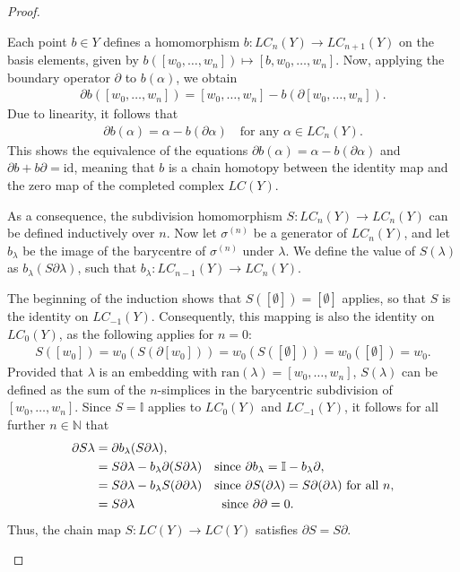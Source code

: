 \begin{proof}
\begin{enumerate}
	Each point \(b \in Y\) defines a homomorphism \(b: LC_n(Y) \rightarrow LC_{n+1}(Y)\) on the basis elements, given by $b([w_0, \ldots, w_n]) \mapsto [b, w_0, \ldots, w_n]$. Now, applying the boundary operator \(\partial\) to \(b(\alpha)\), we obtain
	\begin{align}
		\partial b([w_0, \ldots, w_n]) = [w_0, \ldots, w_n] - b(\partial [w_0, \ldots, w_n]). 
	\end{align}
	Due to linearity, it follows that 
	\begin{align}
		\partial b(\alpha) = \alpha - b(\partial \alpha) \quad \text{for any } \alpha \in LC_n(Y). 
	\end{align}
	This shows the equivalence of the equations \(\partial b(\alpha) = \alpha - b(\partial \alpha)\) and \(\partial b + b \partial = \text{id}\), meaning that \(b\) is a chain homotopy between the identity map and the zero map of the completed complex \(LC(Y)\).
		
	As a consequence, the subdivision homomorphism $S: LC_n(Y) \rightarrow LC_n(Y)$ can be defined inductively over $n$. Now let $\sigma^{(n)}$ be a generator of $LC_n(Y)$, and let $b_\lambda$ be the image of the barycentre of $\sigma^{(n)}$ under $\lambda$. We define the value of $S(\lambda)$ as $b_\lambda(S\partial\lambda)$, such that $b_\lambda: LC_{n-1}(Y) \rightarrow LC_n(Y)$. 
		
	The beginning of the induction shows that $S([\emptyset]) = [\emptyset]$ applies, so that $S$ is the identity on $LC_{-1}(Y)$. Consequently, this mapping is also the identity on $LC_0(Y)$, as the following applies for $n=0$: 
	\begin{align}
		S([w_0]) = w_0(S(\partial[w_0])) = w_0(S([\emptyset])) = w_0([\emptyset]) = w_0. 
	\end{align}
	Provided that $\lambda$ is an embedding with $\text{ran}(\lambda) = [w_0, \ldots, w_n]$, $S(\lambda)$ can be defined as the sum of the $n$-simplices in the barycentric subdivision of $[w_0, \ldots, w_n]$. Since $S = \mathbb{I}$ applies to $LC_0(Y)$ and $LC_{-1}(Y)$, it follows for all further $n \in \mathbb{N}$ that
	\begin{align}
		\partial S\lambda & = \partial b_\lambda(S\partial\lambda),                                                                                                                    \\
		                  & = S\partial\lambda - b_\lambda\partial(S\partial\lambda) \quad \text{since } \partial b_\lambda = \mathbb{I} - b_\lambda\partial,                          \\
		                  & = S\partial\lambda - b_\lambda S(\partial\partial\lambda) \quad \text{since } \partial S(\partial\lambda) = S\partial(\partial\lambda) \text{ for all } n, \\
		                  & = S\partial\lambda \hspace{2.45cm} \text{since } \partial\partial = 0.                                                                                     
	\end{align}
	Thus, the chain map $S: LC(Y) \rightarrow LC(Y)$ satisfies $\partial S = S\partial$.
		

\end{enumerate}
\end{proof}
